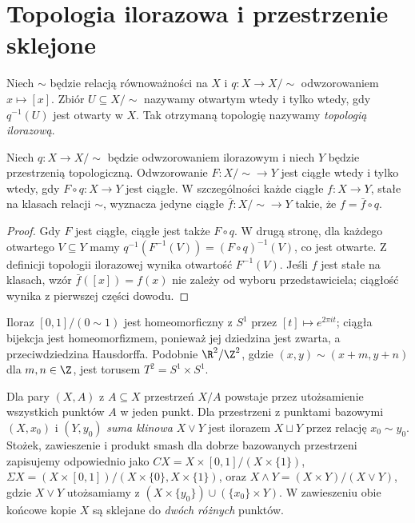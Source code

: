 \section{Topologia ilorazowa i przestrzenie sklejone}

\begin{definicja}
\label{def:topologia-ilorazowa}
Niech $\sim$ będzie relacją równoważności na $X$ i
$q:X\to X/{\sim}$ odwzorowaniem $x\mapsto[x]$.
Zbiór $U\subseteq X/{\sim}$ nazywamy otwartym wtedy i tylko wtedy, gdy
$q^{-1}(U)$ jest otwarty w $X$. Tak otrzymaną topologię nazywamy
\emph{topologią ilorazową}.
\end{definicja}

\begin{twierdzenie}
Niech $q:X\to X/{\sim}$ będzie odwzorowaniem ilorazowym i niech $Y$ będzie
przestrzenią topologiczną. Odwzorowanie $F:X/{\sim}\to Y$ jest ciągłe wtedy
i tylko wtedy, gdy $F\circ q:X\to Y$ jest ciągłe.
W szczególności każde ciągłe $f:X\to Y$, stałe na klasach relacji $\sim$,
wyznacza jedyne ciągłe $\bar f:X/{\sim}\to Y$ takie, że $f=\bar f\circ q$.
\end{twierdzenie}
\begin{proof}
Gdy $F$ jest ciągłe, ciągłe jest także $F\circ q$. W drugą stronę,
dla każdego otwartego $V\subseteq Y$ mamy
$q^{-1}(F^{-1}(V))=(F\circ q)^{-1}(V)$, co jest otwarte.
Z definicji topologii ilorazowej wynika otwartość $F^{-1}(V)$.
Jeśli $f$ jest stałe na klasach, wzór $\bar f([x])=f(x)$ nie zależy od wyboru
przedstawiciela; ciągłość wynika z pierwszej części dowodu.
\end{proof}

\begin{przyklad}
Iloraz $[0,1]/(0\sim1)$ jest homeomorficzny z $S^1$ przez
$[t]\mapsto e^{2\pi it}$; ciągła bijekcja jest homeomorfizmem, ponieważ
jej dziedzina jest zwarta, a przeciwdziedzina Hausdorffa.
Podobnie $\R^2/\Z^2$, gdzie $(x,y)\sim(x+m,y+n)$ dla $m,n\in\Z$,
jest torusem $T^2=S^1\times S^1$.
\end{przyklad}

\begin{definicja}
Dla pary $(X,A)$ z $A\subseteq X$ przestrzeń $X/A$ powstaje przez
utożsamienie wszystkich punktów $A$ w jeden punkt. Dla przestrzeni z
punktami bazowymi $(X,x_0)$ i $(Y,y_0)$ \emph{suma klinowa}
$X\vee Y$ jest ilorazem $X\sqcup Y$ przez relację $x_0\sim y_0$.
Stożek, zawieszenie i produkt smash dla dobrze bazowanych
przestrzeni zapisujemy odpowiednio jako
$CX=X\times[0,1]/(X\times\{1\})$,
$\Sigma X=(X\times[0,1])/(X\times\{0\},X\times\{1\})$,
oraz $X\wedge Y=(X\times Y)/(X\vee Y)$,
gdzie $X\vee Y$ utożsamiamy z
$(X\times\{y_0\})\cup(\{x_0\}\times Y)$.
W zawieszeniu obie końcowe kopie $X$ są sklejane do \emph{dwóch różnych}
punktów.
\end{definicja}

